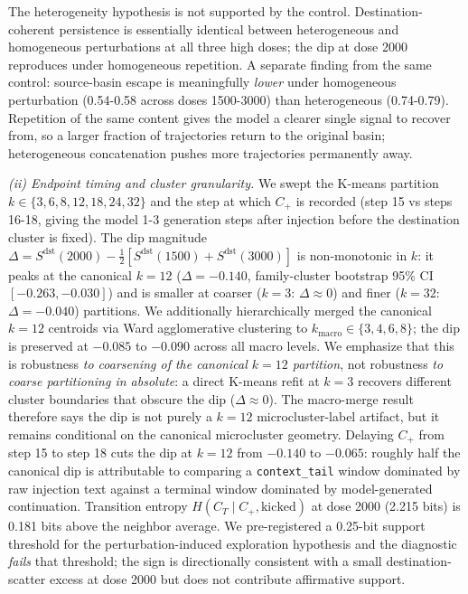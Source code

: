 \documentclass{article}
\theoremstyle{plain}
\theoremstyle{definition}
\begin{document}
The heterogeneity hypothesis is not supported by the control. Destination-coherent persistence is essentially identical between heterogeneous and homogeneous perturbations at all three high doses; the dip at dose 2000 reproduces under homogeneous repetition. A separate finding from the same control: source-basin escape is meaningfully \textit{lower} under homogeneous perturbation (0.54-0.58 across doses 1500-3000) than heterogeneous (0.74-0.79). Repetition of the same content gives the model a clearer single signal to recover from, so a larger fraction of trajectories return to the original basin; heterogeneous concatenation pushes more trajectories permanently away.

\textit{(ii) Endpoint timing and cluster granularity.} We swept the K-means partition $k\in\{3,6,8,12,18,24,32\}$ and the step at which $C_+$ is recorded (step 15 vs steps 16-18, giving the model 1-3 generation steps after injection before the destination cluster is fixed). The dip magnitude $\Delta = S^{\mathrm{dst}}(2000) - \tfrac{1}{2}[S^{\mathrm{dst}}(1500)+S^{\mathrm{dst}}(3000)]$ is non-monotonic in $k$: it peaks at the canonical $k=12$ ($\Delta=-0.140$, family-cluster bootstrap 95\% CI $[-0.263,-0.030]$) and is smaller at coarser ($k=3$: $\Delta\approx 0$) and finer ($k=32$: $\Delta=-0.040$) partitions. We additionally hierarchically merged the canonical $k=12$ centroids via Ward agglomerative clustering to $k_{\mathrm{macro}}\in\{3,4,6,8\}$; the dip is preserved at $-0.085$ to $-0.090$ across all macro levels. We emphasize that this is robustness \textit{to coarsening of the canonical $k=12$ partition}, not robustness \textit{to coarse partitioning in absolute}: a direct K-means refit at $k=3$ recovers different cluster boundaries that obscure the dip ($\Delta\approx 0$). The macro-merge result therefore says the dip is not purely a $k=12$ microcluster-label artifact, but it remains conditional on the canonical microcluster geometry. Delaying $C_+$ from step 15 to step 18 cuts the dip at $k=12$ from $-0.140$ to $-0.065$: roughly half the canonical dip is attributable to comparing a \texttt{context\_tail} window dominated by raw injection text against a terminal window dominated by model-generated continuation. Transition entropy $H(C_T \mid C_+, \text{kicked})$ at dose 2000 (2.215 bits) is 0.181 bits above the neighbor average. We pre-registered a 0.25-bit support threshold for the perturbation-induced exploration hypothesis and the diagnostic \textit{fails} that threshold; the sign is directionally consistent with a small destination-scatter excess at dose 2000 but does not contribute affirmative support.
\end{document}
